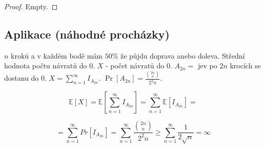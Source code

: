 \begin{proof}
	Empty.
\end{proof}

\subsection{Aplikace (náhodné procházky)}

$n$ kroků a v každém bodě mám $50\%$ že půjdu doprava anebo doleva. Střední hodnota počtu návratů do $0$. $X$ - počet návratů do $0$. $A_{2n}=$ jev po $2n$ krocích se dostanu do $0$. $X = \sum_{n=1}^{\infty} I_{A_{2n}}$. $\Pr[A_{2n}]=\frac{\binom{2n}{n}}{2^2n}$.

$$
\mathbb{E}[X] = \mathbb{E}[\sum_{n=1}^{\infty}I_{A_{2n}}] = \sum_{n=1}^{\infty} \mathbb{E} [I_{A_{2n}}] = 
$$

$$
= \sum_{n=1}^{\infty} Pr [I_{A_{2n}}] = \sum_{n=1}^{\infty} \frac{\binom{2n}{n}}{2^2n} \geq \sum_{n=1}^{\infty} \frac{1}{2\sqrt{n}} = \infty
$$
